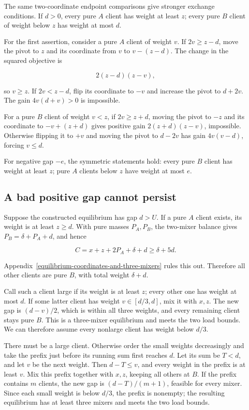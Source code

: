 \documentclass[11pt]{amsart}
\numberwithin{equation}{section}
\theoremstyle{definition}
\begin{document}
The same two-coordinate endpoint comparisons give stronger exchange conditions. If \(d>0\), every pure \(A\) client has weight at least \(z\); every pure \(B\) client of weight below \(z\) has weight at most \(d\).

For the first assertion, consider a pure \(A\) client of weight \(v\). If \(2v\ge z-d\), move the pivot to \(z\) and its coordinate from \(v\) to \(v-(z-d)\). The change in the squared objective is

\[
2(z-d)(z-v),
\]

so \(v\ge z\). If \(2v<z-d\), flip its coordinate to \(-v\) and increase the pivot to \(d+2v\). The gain \(4v(d+v)>0\) is impossible.

For a pure \(B\) client of weight \(v<z\), if \(2v\ge z+d\), moving the pivot to \(-z\) and its coordinate to \(-v+(z+d)\) gives positive gain \(2(z+d)(z-v)\), impossible. Otherwise flipping it to \(+v\) and moving the pivot to \(d-2v\) has gain \(4v(v-d)\), forcing \(v\le d\).

For negative gap \(-e\), the symmetric statements hold: every pure \(B\) client has weight at least \(z\); pure \(A\) clients below \(z\) have weight at most \(e\).


\subsection{A bad positive gap cannot persist}\label{a-bad-positive-gap-cannot-persist}

Suppose the constructed equilibrium has gap \(d>U\). If a pure \(A\) client exists, its weight is at least \(z\ge d\). With pure masses \(P_A,P_B\), the two-mixer balance gives \(P_B=\delta+P_A+d\), and hence

\[
C=x+z+2P_A+\delta+d\ge\delta+5d.
\]

Appendix~\ref{equilibrium-coordinates-and-three-mixers} rules this out. Therefore all other clients are pure \(B\), with total weight \(\delta+d\).

Call such a client large if its weight is at least \(z\); every other one has weight at most \(d\). If some latter client has weight \(v\in[d/3,d]\), mix it with \(x,z\). The new gap is \((d-v)/2\), which is within all three weights, and every remaining client stays pure \(B\). This is a three-mixer equilibrium and meets the two load bounds. We can therefore assume every nonlarge client has weight below \(d/3\).

There must be a large client. Otherwise order the small weights decreasingly and take the prefix just before its running sum first reaches \(d\). Let its sum be \(T<d\), and let \(v\) be the next weight. Then \(d-T\le v\), and every weight in the prefix is at least \(v\). Mix this prefix together with \(x,z\), keeping all others at \(B\). If the prefix contains \(m\) clients, the new gap is \((d-T)/(m+1)\), feasible for every mixer. Since each small weight is below \(d/3\), the prefix is nonempty; the resulting equilibrium has at least three mixers and meets the two load bounds.
\end{document}
